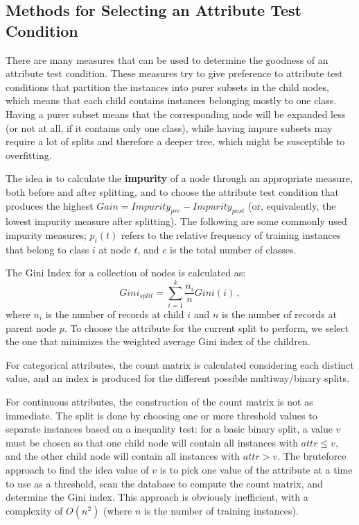 \subsection{Methods for Selecting an Attribute Test Condition}

There are many measures that can be used to determine the goodness of an attribute test condition. These measures try to give preference to attribute test conditions that partition the instances into purer subsets in the child nodes, which means that each child contains instances belonging mostly to one class. Having a purer subset means that the corresponding node will be expanded less (or not at all, if it contains only one class), while having impure subsets may require a lot of splits and therefore a deeper tree, which might be susceptible to overfitting.

The idea is to calculate the \textbf{impurity} of a node through an appropriate measure, both before and after splitting, and to choose the attribute test condition that produces the highest $Gain = Impurity_{pre} - Impurity_{post}$ (or, equivalently, the lowest impurity measure after splitting). The following are some commonly used impurity measures; $p_i(t)$ refers to the relative frequency of training instances that belong to class $i$ at node $t$, and $c$ is the total number of classes.

The Gini Index for a collection of nodes is calculated as:
\begin{equation*}
    Gini_{split} = \sum_{i=1}^k \dfrac{n_i}{n} Gini(i) \,,
\end{equation*}
where $n_i$ is the number of records at child $i$ and $n$ is the number of records at parent node $p$. To choose the attribute for the current split to perform, we select the one that minimizes the weighted average Gini index of the children.

For categorical attributes, the count matrix is calculated considering each distinct value, and an index is produced for the different possible multiway/binary splits.

For continuous attributes, the construction of the count matrix is not as immediate. The split is done by choosing one or more threshold values to separate instances based on a inequality test: for a basic binary split, a value $v$ must be chosen so that one child node will contain all instances with $attr \leq v$, and the other child node will contain all instances with $attr > v$. The bruteforce approach to find the idea value of $v$ is to pick one value of the attribute at a time to use as a threshold, scan the database to compute the count matrix, and determine the Gini index. This approach is obviously inefficient, with a complexity of $O(n^2)$ (where $n$ is the number of training instances).

